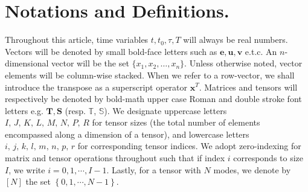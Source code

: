 \section{Notations and Definitions.}
\label{sec:notations}

\noindent Throughout this article, time variables \eg $t, t_0, \tau, T$ will always be  real numbers. Vectors will be denoted by small bold-face letters such as $\mathbf{e}, \mathbf{u}, \mathbf{v}$  e.t.c. An $n$-dimensional vector will be the set $\{x_1, x_2, \ldots, x_n\}$. Unless otherwise noted, vector elements will be column-wise stacked. When we refer to a row-vector, we shall introduce the transpose as a superscript operator \ie  $\bm{x}^T$. Matrices and tensors will respectively be denoted by bold-math upper case  Roman and double stroke font letters  e.g. $\mathbf{T}, \mathbf{S}$ (resp. $\mathbf{\mathds{T}}$, $\mathbf{\mathds{S}}$).  We designate uppercase letters $I, \, J, \, K, \, L, \, M, \, N, \, P, \, R$ for tensor sizes (the total number of elements encompassed along a dimension of a tensor), and lowercase letters $i, \,j, \,k, \,l, \, m, \, n, \, p, \, r$ for corresponding tensor indices. We adopt zero-indexing for matrix and tensor operations throughout such that if index $i$ corresponds to size $I$, we write $i = 0, 1, \cdots , I-1$. Lastly, for a tensor with $N$ modes, we denote by $\left[N\right]$ the set $\left\{0,1,\cdots,N-1\right\}$.

%
%
%
%
